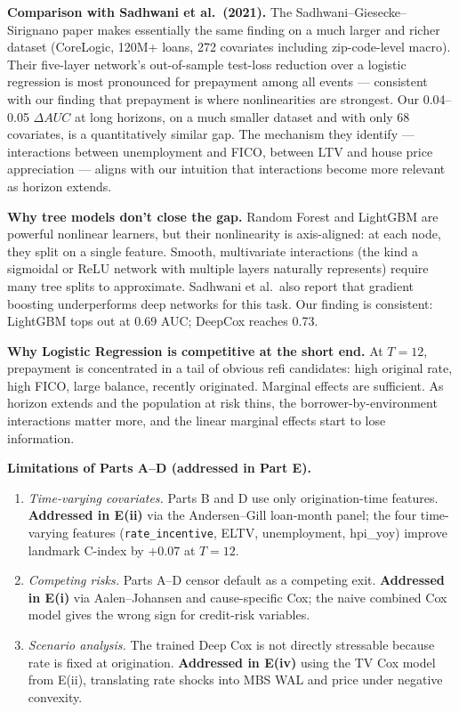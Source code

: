 \documentclass[11pt,a4paper]{article}
\begin{document}
\textbf{Comparison with Sadhwani et al.\ (2021).} The Sadhwani--Giesecke--Sirignano paper makes essentially the same finding on a much larger and richer dataset (CoreLogic, 120M+ loans, 272 covariates including zip-code-level macro). Their five-layer network's out-of-sample test-loss reduction over a logistic regression is most pronounced for prepayment among all events --- consistent with our finding that prepayment is where nonlinearities are strongest. Our 0.04--0.05 $\Delta AUC$ at long horizons, on a much smaller dataset and with only 68 covariates, is a quantitatively similar gap. The mechanism they identify --- interactions between unemployment and FICO, between LTV and house price appreciation --- aligns with our intuition that interactions become more relevant as horizon extends.

\textbf{Why tree models don't close the gap.} Random Forest and LightGBM are powerful nonlinear learners, but their nonlinearity is axis-aligned: at each node, they split on a single feature. Smooth, multivariate interactions (the kind a sigmoidal or ReLU network with multiple layers naturally represents) require many tree splits to approximate. Sadhwani et al.\ also report that gradient boosting underperforms deep networks for this task. Our finding is consistent: LightGBM tops out at 0.69 AUC; DeepCox reaches 0.73.

\textbf{Why Logistic Regression is competitive at the short end.} At $T{=}12$, prepayment is concentrated in a tail of obvious refi candidates: high original rate, high FICO, large balance, recently originated. Marginal effects are sufficient. As horizon extends and the population at risk thins, the borrower-by-environment interactions matter more, and the linear marginal effects start to lose information.

\textbf{Limitations of Parts A--D (addressed in Part E).}
\begin{enumerate}[leftmargin=1.5em,itemsep=2pt,topsep=2pt]
  \item \emph{Time-varying covariates.} Parts B and D use only origination-time features. \textbf{Addressed in E(ii)} via the Andersen--Gill loan-month panel; the four time-varying features (\texttt{rate\_incentive}, ELTV, unemployment, hpi\_yoy) improve landmark C-index by $+0.07$ at $T = 12$.
  \item \emph{Competing risks.} Parts A--D censor default as a competing exit. \textbf{Addressed in E(i)} via Aalen--Johansen and cause-specific Cox; the naive combined Cox model gives the wrong sign for credit-risk variables.
  \item \emph{Scenario analysis.} The trained Deep Cox is not directly stressable because rate is fixed at origination. \textbf{Addressed in E(iv)} using the TV Cox model from E(ii), translating rate shocks into MBS WAL and price under negative convexity.
\end{enumerate}
\end{document}
